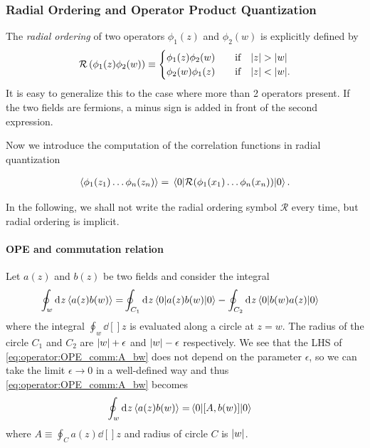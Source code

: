 \documentclass[10pt]{article}
\newenvironment{boxmath}[1]{\begin{tcolorbox}[enhanced,attach boxed title to top center={yshift=-\tcboxedtitleheight/2},boxrule=1pt,title={\centering #1},colframe=NavyBlue!70!black,colback=NavyBlue!10,colbacktitle=NavyBlue!10,fonttitle=\scshape,coltitle=Black]}{\end{tcolorbox}}
\begin{document}
\subsubsection{Radial Ordering and Operator Product Quantization}
\begin{definition}
    The \textit{radial ordering} of two operators $\phi_1(z)$ and $\phi_2(w)$ is explicitly defined by\snm
    \begin{align}
        \mathcal{R}\left(\phi_1(z)\phi_2(w)\right)\equiv\begin{cases}
                                                            \phi_1(z)\phi_2(w) & \qif\abs{z}>\abs{w}  \\
                                                            \phi_2(w)\phi_1(z) & \qif\abs{z}<\abs{w}.
                                                        \end{cases}
    \end{align}
    It is easy to generalize this to the case where more than 2 operators present.
    If the two fields are fermions, a minus sign is added in front of the second expression.
\end{definition}
Now we introduce the computation of the correlation functions in radial quantization
\begin{boxmath}{Radial Quantization}
    \begin{align}
        \expval{\phi_1(z_1)\dots\phi_n(z_n)}=\ev*{\mathcal{R}(\phi_1(x_1)\dots\phi_n(x_n))}{0}.
    \end{align}
\end{boxmath}
In the following, we shall not write the radial ordering symbol $\mathcal{R}$ every time, but radial ordering is implicit.
\paragraph{OPE and commutation relation}
Let $a(z)$ and $b(z)$ be two fields and consider the integral
\begin{align}
    \oint_w\dd[]{z}\expval{a(z)b(w)}= & \oint_{C_1}\dd[]{z}\ev**{a(z)b(w)}{0}-\oint_{C_2}\dd[]{z}\ev**{b(w)a(z)}{0}\label{eq:operator:OPE_comm:A_bw}
\end{align}
where the integral $\oint_w\dd[]{z}$ is evaluated along a circle at $z=w$.
The radius of the circle $C_1$ and $C_2$ are $\abs{w}+\epsilon$ and $\abs{w}-\epsilon$ respectively.
We see that the LHS of \cref{eq:operator:OPE_comm:A_bw} does not depend on the parameter $\epsilon$, so we can take the limit $\epsilon\to0$ in a well-defined way and thus \cref{eq:operator:OPE_comm:A_bw} becomes
\begin{align}
    \oint_w\dd[]{z}\expval{a(z)b(w)}= & \ev**{\comm{A}{b(w)}}{0}\label{eq:operator:OPE_comm:def}
\end{align}
where $A\equiv\oint_C a(z)\dd[]{z}$ and radius of circle $C$ is $\abs{w}$.
\end{document}
